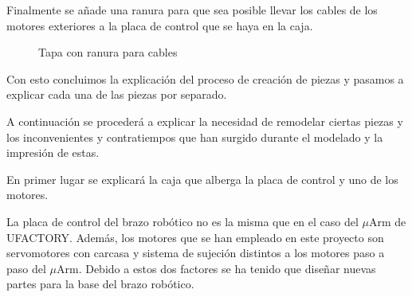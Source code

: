 Finalmente se añade una ranura para que sea posible llevar los cables de los motores exteriores a la placa de control que se haya en la caja.

\begin{figure}[H]
\centering
{}
\caption{Tapa con ranura para cables}
\label{fig:ranura_cables_tapa_superior}
\end{figure}

Con esto concluimos la explicación del proceso de creación de piezas y pasamos a explicar cada una de las piezas por separado.

A continuación se procederá a explicar la necesidad de remodelar ciertas piezas y los inconvenientes y contratiempos que han surgido durante el modelado y la impresión de estas.

En primer lugar se explicará la caja que alberga la placa de control y uno de los motores.

La placa de control del brazo robótico no es la misma que en el caso del $\mu$Arm de UFACTORY. Además, los motores que se han empleado en este proyecto son servomotores con carcasa y sistema de sujeción distintos a los motores paso a paso del $\mu$Arm. Debido a estos dos factores se ha tenido que diseñar nuevas partes para la base del brazo robótico.

